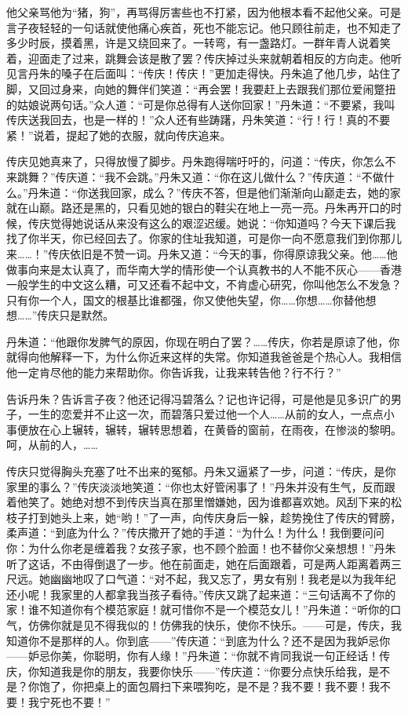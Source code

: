 \documentclass[UTF8]{ctexart}
\begin{document}
他父亲骂他为“猪，狗”，再骂得厉害些也不打紧，因为他根本看不起他父亲。可是言子夜轻轻的一句话就使他痛心疾首，死也不能忘记。他只顾往前走，也不知走了多少时辰，摸着黑，许是又绕回来了。一转弯，有一盏路灯。一群年青人说着笑着，迎面走了过来，跳舞会该是散了罢？传庆掉过头来就朝着相反的方向走。他听见言丹朱的嗓子在后面叫：“传庆！传庆！”更加走得快。丹朱追了他几步，站住了脚，又回过身来，向她的舞伴们笑道：“再会罢！我要赶上去跟我们那位爱闹蹩扭的姑娘说两句话。”众人道：“可是你总得有人送你回家！”丹朱道：“不要紧，我叫传庆送我回去，也是一样的！”众人还有些踌躇，丹朱笑道：“行！行！真的不要紧！”说着，提起了她的衣服，就向传庆追来。

传庆见她真来了，只得放慢了脚步。丹朱跑得喘吁吁的，问道：“传庆，你怎么不来跳舞？”传庆道：“我不会跳。”丹朱又道：“你在这儿做什么？”传庆道：“不做什么。”丹朱道：“你送我回家，成么？”传庆不答，但是他们渐渐向山巅走去，她的家就在山巅。路还是黑的，只看见她的银白的鞋尖在地上一亮一亮。丹朱再开口的时候，传庆觉得她说话从来没有这么的艰涩迟缓。她说：“你知道吗？今天下课后我找了你半天，你已经回去了。你家的住址我知道，可是你一向不愿意我们到你那儿来……！”传庆依旧是不赞一词。丹朱又道：“今天的事，你得原谅我父亲。他……他做事向来是太认真了，而华南大学的情形使一个认真教书的人不能不灰心——香港一般学生的中文这么糟，可又还看不起中文，不肯虚心研究，你叫他怎么不发急？只有你一个人，国文的根基比谁都强，你又使他失望，你……你想……你替他想想……”传庆只是默然。

丹朱道：“他跟你发脾气的原因，你现在明白了罢？……传庆，你若是原谅了他，你就得向他解释一下，为什么你近来这样的失常。你知道我爸爸是个热心人。我相信他一定肯尽他的能力来帮助你。你告诉我，让我来转告他？行不行？”

告诉丹朱？告诉言子夜？他还记得冯碧落么？记也许记得，可是他是见多识广的男子，一生的恋爱并不止这一次，而碧落只爱过他一个人……从前的女人，一点点小事便放在心上辗转，辗转，辗转思想着，在黄昏的窗前，在雨夜，在惨淡的黎明。呵，从前的人，……

传庆只觉得胸头充塞了吐不出来的冤郁。丹朱又逼紧了一步，问道：“传庆，是你家里的事么？”传庆淡淡地笑道：“你也太好管闲事了！”丹朱并没有生气，反而跟着他笑了。她绝对想不到传庆当真在那里憎嫌她，因为谁都喜欢她。风刮下来的松枝子打到她头上来，她“哟！”了一声，向传庆身后一躲，趁势挽住了传庆的臂膀，柔声道：“到底为什么？”传庆撒开了她的手道：“为什么！为什么！我倒要问问你：为什么你老是缠着我？女孩子家，也不顾个脸面！也不替你父亲想想！”丹朱听了这话，不由得倒退了一步。他在前面走，她在后面跟着，可是两人距离着两三尺远。她幽幽地叹了口气道：“对不起，我又忘了，男女有别！我老是以为我年纪还小呢！我家里的人都拿我当孩子看待。”传庆又跳了起来道：“三句话离不了你的家！谁不知道你有个模范家庭！就可惜你不是一个模范女儿！”丹朱道：“听你的口气，仿佛你就是见不得我似的！仿佛我的快乐，使你不快乐。——可是，传庆，我知道你不是那样的人。你到底——”传庆道：“到底为什么？还不是因为我妒忌你——妒忌你美，你聪明，你有人缘！”丹朱道：“你就不肯同我说一句正经话！传庆，你知道我是你的朋友，我要你快乐——”传庆道：“你要分点快乐给我，是不是？你饱了，你把桌上的面包屑扫下来喂狗吃，是不是？我不要！我不要！我不要！我宁死也不要！”
\end{document}
